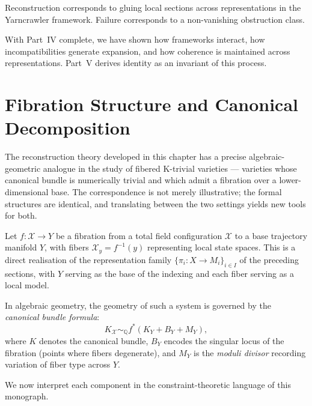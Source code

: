 \documentclass[11pt,openany]{book}
\begin{document}
\begin{proposition}
\label{prop:gluing}
Reconstruction corresponds to gluing local sections across
representations in the Yarncrawler framework. Failure
corresponds to a non-vanishing obstruction class.
\end{proposition}

With Part~IV complete, we have shown how frameworks
interact, how incompatibilities generate expansion, and how
coherence is maintained across representations. Part~V
derives identity as an invariant of this process.


\section{Fibration Structure and Canonical Decomposition}
\label{sec:fibration-canonical}

The reconstruction theory developed in this chapter has a
precise algebraic-geometric analogue in the study of
fibered K-trivial varieties --- varieties whose canonical
bundle is numerically trivial and which admit a fibration
over a lower-dimensional base.  The correspondence is
not merely illustrative; the formal structures are
identical, and translating between the two settings yields
new tools for both.

Let $f : \mathcal{X} \to Y$ be a fibration from a total
field configuration $\mathcal{X}$ to a base trajectory
manifold $Y$, with fibers $\mathcal{X}_y = f^{-1}(y)$
representing local state spaces.  This is a direct
realisation of the representation family
$\{\pi_i : X \to M_i\}_{i \in I}$ of the preceding
sections, with $Y$ serving as the base of the indexing
and each fiber serving as a local model.

In algebraic geometry, the geometry of such a system is
governed by the \emph{canonical bundle formula}:
\[
  K_{\mathcal{X}} \sim_{\mathbb{Q}}
    f^*\!\left(K_Y + B_Y + M_Y\right),
\]
where $K$ denotes the canonical bundle, $B_Y$ encodes the
singular locus of the fibration (points where fibers
degenerate), and $M_Y$ is the \emph{moduli divisor}
recording variation of fiber type across $Y$.

We now interpret each component in the constraint-theoretic
language of this monograph.
\end{document}
